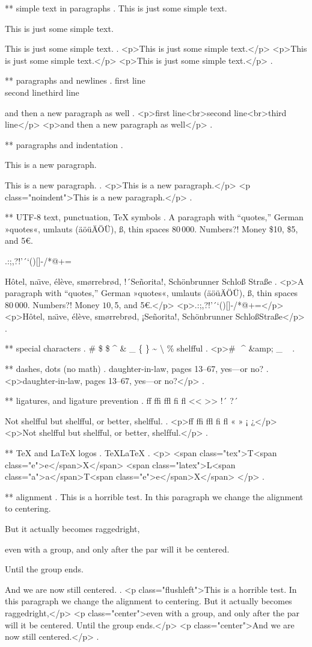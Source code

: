 ** simple text in paragraphs
.
This is just some simple text.

This is just some simple text.

This is just some simple text.
.
<p>This is just some simple text.</p>
<p>This is just some simple text.</p>
<p>This is just some simple text.</p>
.


** paragraphs and newlines
.
first line\\second line\newline third line\par and then a new paragraph as well
.
<p>ﬁrst line<br>second line<br>third line</p>
<p>and then a new paragraph as well</p>
.


** paragraphs and indentation
.
\noindent

\noindent

This is a new paragraph.

\noindent
This is a new paragraph.
.
<p>This is a new paragraph.</p>
<p class="noindent">This is a new paragraph.</p>
.


** UTF-8 text, punctuation, TeX symbols
.
A para\-graph with “quotes,” German »quotes«, umlauts (äöüÄÖÜ), ß, thin spaces 80\,000. Numbers?! Money \$10, \$5, and 5€.

.:;,?!'´`()[]-/*@+=

H\^otel, na\"\i ve, \'el\`eve, sm\o rrebr\o d, !´Se\~norita!, Sch\"onbrunner Schlo\ss{} Stra\ss e
.
<p>A para­graph with “quotes,” German »quotes«, umlauts (äöüÄÖÜ), ß, thin spaces 80 000. Numbers?! Money $10, $5, and 5€.</p>
<p>.:;,?!’´‘()[]‐/*@+=</p>
<p>Hôtel, naı̈ve, élève, smørrebrød, ¡Señorita!, Schönbrunner Schloß​ Straße</p>
.


** special characters
.
\# \$ \$ \^{} \& \_ \{ \} \~{} \textbackslash{} \% shelf\-ful
.
<p># $ $ ^​ &amp; _ { } ~​ \​ %
.


** dashes, dots (no math)
.
daughter-in-law, pages 13--67, yes---or no?
.
<p>daughter‐in‐law, pages 13–67, yes—or no?</p>
.


** ligatures, and ligature prevention
.
ff ffi ffl fi fl << >> !´ ?´

Not shelfful but shelf\mbox{}ful, or better, shelf\/ful.
.
<p>ﬀ ﬃ ﬄ ﬁ ﬂ « » ¡ ¿</p>
<p>Not shelﬀul but shelfful, or better, shelf‌ful.</p>
.


** TeX and LaTeX logos
.
\TeX \LaTeX
.
<p>
<span class="tex">T<span class="e">e</span>X</span>
<span class="latex">L<span class="a">a</span>T<span class="e">e</span>X</span>
</p>
.


** alignment
.
This is a horrible test.
\centering
In this paragraph we change the alignment to centering.
{\raggedright But it actually becomes raggedright,

even with a group, and only after the par will it be centered.}
Until the group ends.

And we are now still centered.
.
<p class="flushleft">This is a horrible test. In this paragraph we change the alignment to centering. But it actually becomes raggedright,</p>
<p class="center">even with a group, and only after the par will it be centered.​ Until the group ends.</p>
<p class="center">And we are now still centered.</p>
.
